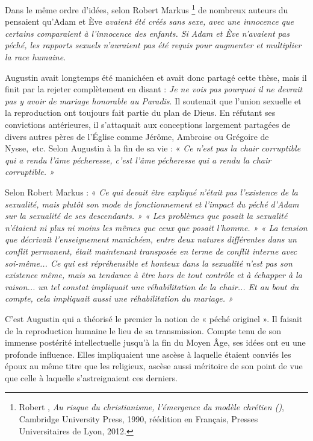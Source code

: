  Dans le même ordre d'idées, selon Robert Markus%
\footnote{Robert , \emph{Au risque du christianisme, l'émergence du modèle chrétien ()}, Cambridge University Press, 1990, réédition en Français, Presses Universitaires de Lyon, 2012.} 
de nombreux auteurs du  pensaient qu'Adam et Ève \emph{avaient été créés sans sexe, avec une innocence que certains comparaient à l'innocence des enfants. Si Adam et Ève n'avaient pas péché, les rapports sexuels n'auraient pas été requis pour augmenter et multiplier la race humaine}.

 Augustin avait longtemps été manichéen et avait donc partagé cette thèse, mais il finit par la rejeter complètement en disant : \emph{Je ne vois pas pourquoi il ne devrait pas y avoir de mariage honorable au Paradis}. Il soutenait que l'union sexuelle et la reproduction ont toujours fait partie du plan de Dieus. En réfutant ses convictions antérieures, il s'attaquait aux conceptions largement partagées de divers autres pères de l'Église comme Jérôme, Ambroise ou Grégoire de Nysse,~etc. Selon Augustin à la fin de sa vie : « \emph{Ce n'est pas la chair corruptible qui a rendu l'âme pécheresse, c'est l'âme pécheresse qui a rendu la chair corruptible. » }

Selon Robert Markus :  «\emph{ Ce qui devait être expliqué n'était pas l'existence de la sexualité, mais plutôt son mode de fonctionnement et l'impact du péché d'Adam sur la sexualité de ses descendants. » « Les problèmes que posait la sexualité n'étaient ni plus ni moins les mêmes que ceux que posait l'homme. »  « La tension que décrivait l'enseignement manichéen, entre deux natures différentes dans un conflit permanent, était maintenant transposée en terme de conflit interne avec soi-même... Ce qui est répréhensible et honteux dans la sexualité n'est pas son existence même, mais sa tendance à être hors de tout contrôle et à échapper à la raison... un tel constat impliquait une réhabilitation de la chair... Et au bout du compte, cela impliquait aussi une réhabilitation du mariage. »} 

 C'est Augustin qui a théorisé le premier la notion de « péché originel ». Il faisait de la reproduction humaine le lieu de sa transmission. Compte tenu de son immense postérité intellectuelle jusqu'à la fin du Moyen Âge, ses idées ont eu une profonde influence. Elles impliquaient une ascèse à laquelle étaient conviés les époux au même titre que les religieux, ascèse aussi méritoire de son point de vue que celle à laquelle s'astreignaient ces derniers. 

